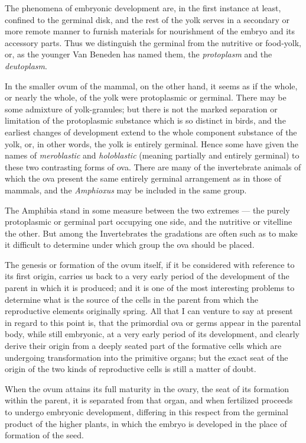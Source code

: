 \documentclass[a4paper, 11pt, oneside, english]{article}
\begin{document}
The phenomena of embryonic development are, in the first instance at least, confined to the germinal disk, and the rest of the yolk serves in a secondary or more remote manner to furnish materials for nourishment of the embryo and its accessory parts. Thus we distinguish the germinal from the nutritive or food-yolk, or, as the younger Van Beneden has named them, the \emph{protoplasm} and the \emph{deutoplasm}.

In the smaller ovum of the mammal, on the other hand, it seems as if the whole, or nearly the whole, of the yolk were protoplasmic or germinal. There may be some admixture of yolk-granules; but there is not the marked separation or limitation of the protoplasmic substance which is so distinct in birds, and the earliest changes of development extend to the whole component substance of the yolk, or, in other words, the yolk is entirely germinal. Hence some have given the names of \emph{meroblastic} and \emph{holoblastic} (meaning partially and entirely germinal) to these two contrasting forms of ova. There are many of the invertebrate animals of which the ova present the same entirely germinal arrangement as in those of mammals, and the \emph{Amphioxus} may be included in the same group.

The Amphibia stand in some measure between the two extremes --- the purely protoplasmic or germinal part occupying one side, and the nutritive or vitelline the other. But among the Invertebrates the gradations are often such as to make it difficult to determine under which group the ova should be placed.

The genesis or formation of the ovum itself, if it be considered with reference to its first origin, carries us back to a very early period of the development of the parent in which it is produced; and it is one of the most interesting problems to determine what is the source of the cells in the parent from which the reproductive elements originally spring. All that I can venture to say at present in regard to this point is, that the primordial ova or germs appear in the parental body, while still embryonic, at a very early period of its development, and clearly derive their origin from a deeply seated part of the formative cells which are undergoing transformation into the primitive organs; but the exact seat of the origin of the two kinds of reproductive cells is still a matter of doubt.

When the ovum attains its full maturity in the ovary, the seat of its formation within the parent, it is separated from that organ, and when fertilized proceeds to undergo embryonic development, differing in this respect from the germinal product of the higher plants, in which the embryo is developed in the place of formation of the seed.
\end{document}
